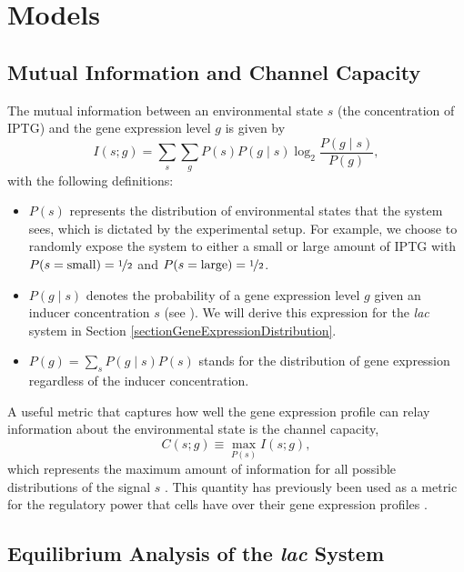 \section{Models}

\subsection{Mutual Information and Channel Capacity}

The mutual information between an environmental state $s$ (the concentration of
IPTG) and the gene expression level $g$ is given by
\begin{equation}
I(s;g) = \sum_s \sum_g P(s) P(g \mid s) \log_2 \frac{P(g \mid s)}{P(g)},
\end{equation}
with the following definitions:
\begin{itemize}
	\item $P(s)$ represents the distribution of environmental states that the
system sees, which is dictated by the experimental setup. For example, we
choose to randomly expose the system to either a small or large amount of IPTG
with $P(s=\text{small}) = \nicefrac{1}{2}$ and $P(s=\text{large}) =
\nicefrac{1}{2}$.
	
	\item $P(g \mid s)$ denotes the probability of a gene expression level $g$
given an inducer concentration $s$ (see \fref[figExpSetup]). We will
derive this expression for the \textit{lac} system in Section
\ref{sectionGeneExpressionDistribution}.
	
	\item $P(g) = \sum_s P(g \mid s) P(s)$ stands for the distribution of gene
	expression regardless of the inducer concentration.
\end{itemize}

A useful
metric that captures how well the gene expression profile can relay information about the environmental state is the channel capacity,
\begin{equation} \label{eqChannelCapacity}
C(s; g) \equiv \max_{P(s)} I(s; g),
\end{equation}
which represents the maximum amount of information for all possible
distributions of the signal $s$ \cite{Rhee2012a}. This quantity has previously
been used as a metric for the regulatory power that cells have over their gene
expression profiles \cite{Tkacik2008a, Rieckh2014}.

\subsection{Equilibrium Analysis of the \textit{lac} System}

